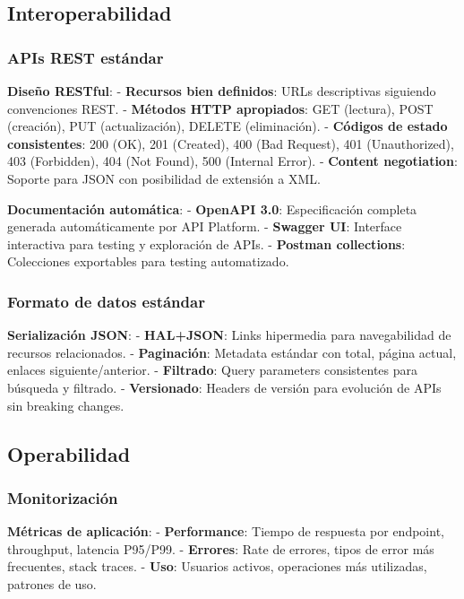 \documentclass[12pt,a4paper,oneside]{report}
\begin{document}
\subsection{Interoperabilidad}\label{interoperabilidad}

\subsubsection{APIs REST estándar}\label{apis-rest-estuxe1ndar}

\textbf{Diseño RESTful}: - \textbf{Recursos bien definidos}: URLs
descriptivas siguiendo convenciones REST. - \textbf{Métodos HTTP
apropiados}: GET (lectura), POST (creación), PUT (actualización), DELETE
(eliminación). - \textbf{Códigos de estado consistentes}: 200 (OK), 201
(Created), 400 (Bad Request), 401 (Unauthorized), 403 (Forbidden), 404
(Not Found), 500 (Internal Error). - \textbf{Content negotiation}:
Soporte para JSON con posibilidad de extensión a XML.

\textbf{Documentación automática}: - \textbf{OpenAPI 3.0}:
Especificación completa generada automáticamente por API Platform. -
\textbf{Swagger UI}: Interface interactiva para testing y exploración de
APIs. - \textbf{Postman collections}: Colecciones exportables para
testing automatizado.

\subsubsection{Formato de datos
estándar}\label{formato-de-datos-estuxe1ndar}

\textbf{Serialización JSON}: - \textbf{HAL+JSON}: Links hipermedia para
navegabilidad de recursos relacionados. - \textbf{Paginación}: Metadata
estándar con total, página actual, enlaces siguiente/anterior. -
\textbf{Filtrado}: Query parameters consistentes para búsqueda y
filtrado. - \textbf{Versionado}: Headers de versión para evolución de
APIs sin breaking changes.

\subsection{Operabilidad}\label{operabilidad}

\subsubsection{Monitorización}\label{monitorizaciuxf3n}

\textbf{Métricas de aplicación}: - \textbf{Performance}: Tiempo de
respuesta por endpoint, throughput, latencia P95/P99. -
\textbf{Errores}: Rate de errores, tipos de error más frecuentes, stack
traces. - \textbf{Uso}: Usuarios activos, operaciones más utilizadas,
patrones de uso.
\end{document}

